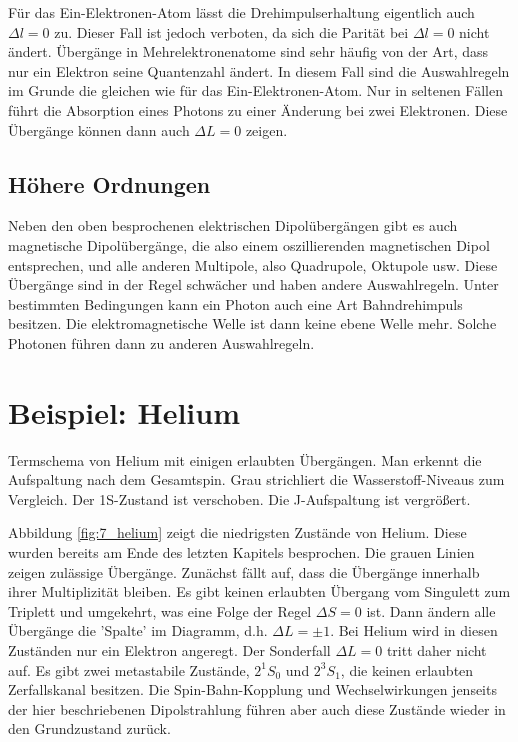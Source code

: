 Für das Ein-Elektronen-Atom lässt die Drehimpulserhaltung eigentlich auch $\Delta l = 0$ zu. Dieser Fall ist jedoch verboten, da sich die Parität bei $\Delta l = 0$ nicht ändert. Übergänge in Mehrelektronenatome sind sehr häufig von der Art, dass nur ein Elektron seine Quantenzahl ändert. In diesem Fall sind die Auswahlregeln im Grunde die gleichen wie für das Ein-Elektronen-Atom. Nur in seltenen Fällen führt die Absorption eines Photons zu einer Änderung bei zwei Elektronen. Diese Übergänge können dann auch $\Delta L = 0$ zeigen.



\subsection{Höhere Ordnungen}


Neben den oben besprochenen elektrischen Dipolübergängen gibt es auch magnetische Dipolübergänge, die also einem oszillierenden magnetischen Dipol entsprechen, und alle anderen Multipole, also Quadrupole, Oktupole usw. Diese Übergänge sind in der Regel schwächer und haben andere Auswahlregeln. Unter bestimmten Bedingungen kann ein Photon auch eine Art Bahndrehimpuls besitzen. Die elektromagnetische Welle ist dann keine ebene Welle mehr. Solche Photonen führen dann zu  anderen Auswahlregeln.



\section{Beispiel: Helium}

\begin{marginfigure}
    \caption{Termschema von Helium mit einigen erlaubten Übergängen. Man erkennt die Aufspaltung nach dem Gesamtspin. Grau strichliert die Wasserstoff-Niveaus zum Vergleich. Der 1S-Zustand ist verschoben. Die J-Aufspaltung ist vergrößert.}
    \label{fig:7_helium}
\end{marginfigure}

Abbildung \ref{fig:7_helium} zeigt die niedrigsten Zustände von Helium. Diese wurden bereits am Ende des letzten Kapitels besprochen. Die grauen Linien zeigen  zulässige Übergänge. Zunächst fällt auf, dass die Übergänge innerhalb ihrer Multiplizität bleiben. Es gibt keinen erlaubten Übergang vom Singulett zum Triplett und umgekehrt, was eine Folge der Regel $\Delta S = 0$ ist. Dann ändern alle Übergänge die 'Spalte' im Diagramm, d.h. $\Delta L = \pm 1$. Bei Helium wird in diesen Zuständen nur ein Elektron angeregt. Der Sonderfall $\Delta L = 0$ tritt daher nicht auf. Es gibt zwei metastabile Zustände, $2^1S_0$ und $2^3S_1$, die keinen erlaubten Zerfallskanal besitzen. Die Spin-Bahn-Kopplung und Wechselwirkungen jenseits der hier beschriebenen Dipolstrahlung führen aber auch diese Zustände wieder in den Grundzustand zurück.



